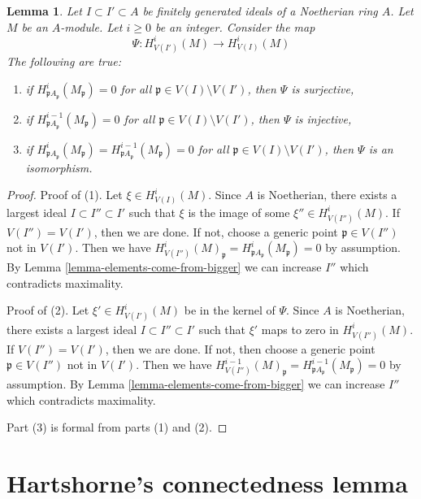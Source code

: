 \documentclass{stacks-project}
\theoremstyle{plain}
\newtheorem{lemma}[subsection]{Lemma}
\theoremstyle{definition}
\theoremstyle{remark}
\numberwithin{equation}{subsection}
\begin{document}
\begin{lemma}
\label{lemma-isomorphism}
Let $I \subset I' \subset A$ be finitely generated ideals of a
Noetherian ring $A$. Let $M$ be an $A$-module. Let $i \geq 0$ be an integer.
Consider the map
$$
\Psi : H^i_{V(I')}(M) \to H^i_{V(I)}(M)
$$
The following are true:
\begin{enumerate}
\item if $H^i_{\mathfrak pA_\mathfrak p}(M_\mathfrak p) = 0$
for all $\mathfrak p \in V(I) \setminus V(I')$, then
$\Psi$ is surjective,
\item if $H^{i - 1}_{\mathfrak pA_\mathfrak p}(M_\mathfrak p) = 0$
for all $\mathfrak p \in V(I) \setminus V(I')$, then
$\Psi$ is injective,
\item if $H^i_{\mathfrak pA_\mathfrak p}(M_\mathfrak p) =
H^{i - 1}_{\mathfrak pA_\mathfrak p}(M_\mathfrak p) = 0$
for all $\mathfrak p \in V(I) \setminus V(I')$, then
$\Psi$ is an isomorphism.
\end{enumerate}
\end{lemma}

\begin{proof}
Proof of (1).
Let $\xi \in H^i_{V(I)}(M)$. Since $A$ is Noetherian, there exists a
largest ideal $I \subset I'' \subset I'$ such that $\xi$ is the image
of some $\xi'' \in H^i_{V(I'')}(M)$. If $V(I'') = V(I')$, then we are
done. If not, choose a generic point $\mathfrak p \in V(I'')$ not in $V(I')$.
Then we have $H^i_{V(I'')}(M)_\mathfrak p =
H^i_{\mathfrak pA_\mathfrak p}(M_\mathfrak p) = 0$ by assumption.
By Lemma \ref{lemma-elements-come-from-bigger} we can increase $I''$
which contradicts maximality.

\medskip\noindent
Proof of (2). Let $\xi' \in H^i_{V(I')}(M)$ be in the kernel of $\Psi$.
Since $A$ is Noetherian, there exists a
largest ideal $I \subset I'' \subset I'$ such that $\xi'$
maps to zero in $H^i_{V(I'')}(M)$. If $V(I'') = V(I')$, then we are
done. If not, then choose a generic point $\mathfrak p  \in V(I'')$
not in $V(I')$. Then we have $H^{i - 1}_{V(I'')}(M)_\mathfrak p =
H^{i - 1}_{\mathfrak pA_\mathfrak p}(M_\mathfrak p) = 0$ by assumption.
By Lemma \ref{lemma-elements-come-from-bigger} we can increase $I''$
which contradicts maximality.

\medskip\noindent
Part (3) is formal from parts (1) and (2).
\end{proof}





\section{Hartshorne's connectedness lemma}
\label{section-hartshorne-connectedness}
\end{document}
